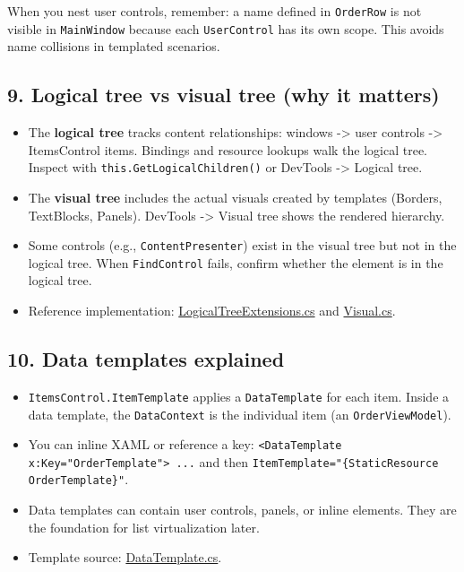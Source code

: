 When you nest user controls, remember: a name defined in
\passthrough{\lstinline!OrderRow!} is not visible in
\passthrough{\lstinline!MainWindow!} because each
\passthrough{\lstinline!UserControl!} has its own scope. This avoids
name collisions in templated scenarios.

\subsection{9. Logical tree vs visual tree (why it
matters)}\label{logical-tree-vs-visual-tree-why-it-matters}

\begin{itemize}
\tightlist
\item
  The \textbf{logical tree} tracks content relationships: windows
  -\textgreater{} user controls -\textgreater{} ItemsControl items.
  Bindings and resource lookups walk the logical tree. Inspect with
  \passthrough{\lstinline!this.GetLogicalChildren()!} or DevTools
  -\textgreater{} Logical tree.
\item
  The \textbf{visual tree} includes the actual visuals created by
  templates (Borders, TextBlocks, Panels). DevTools -\textgreater{}
  Visual tree shows the rendered hierarchy.
\item
  Some controls (e.g., \passthrough{\lstinline!ContentPresenter!}) exist
  in the visual tree but not in the logical tree. When
  \passthrough{\lstinline!FindControl!} fails, confirm whether the
  element is in the logical tree.
\item
  Reference implementation:
  \href{https://github.com/AvaloniaUI/Avalonia/blob/master/src/Avalonia.Base/LogicalTree/LogicalTreeExtensions.cs}{LogicalTreeExtensions.cs}
  and
  \href{https://github.com/AvaloniaUI/Avalonia/blob/master/src/Avalonia.Base/Visual.cs}{Visual.cs}.
\end{itemize}

\subsection{10. Data templates
explained}\label{data-templates-explained}

\begin{itemize}
\tightlist
\item
  \passthrough{\lstinline!ItemsControl.ItemTemplate!} applies a
  \passthrough{\lstinline!DataTemplate!} for each item. Inside a data
  template, the \passthrough{\lstinline!DataContext!} is the individual
  item (an \passthrough{\lstinline!OrderViewModel!}).
\item
  You can inline XAML or reference a key:
  \passthrough{\lstinline!<DataTemplate x:Key="OrderTemplate"> ...!} and
  then
  \passthrough{\lstinline!ItemTemplate="\{StaticResource OrderTemplate\}"!}.
\item
  Data templates can contain user controls, panels, or inline elements.
  They are the foundation for list virtualization later.
\item
  Template source:
  \href{https://github.com/AvaloniaUI/Avalonia/blob/master/src/Markup/Avalonia.Markup.Xaml/Templates/DataTemplate.cs}{DataTemplate.cs}.
\end{itemize}

